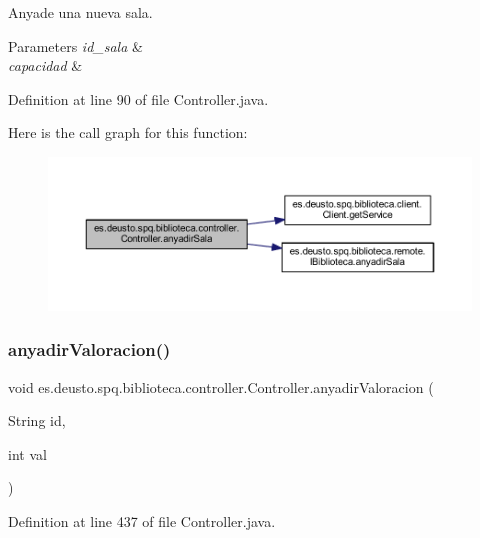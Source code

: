 Anyade una nueva sala. 
\begin{DoxyParams}{Parameters}
{\em id\+\_\+sala} & \\
\hline
{\em capacidad} & \\
\hline
\end{DoxyParams}


Definition at line 90 of file Controller.\+java.

Here is the call graph for this function\+:
\nopagebreak
\begin{figure}[H]
\begin{center}
\leavevmode
\includegraphics[width=350pt]{classes_1_1deusto_1_1spq_1_1biblioteca_1_1controller_1_1_controller_aa000adfc328c903b4915e2e20c94e22d_cgraph}
\end{center}
\end{figure}
\mbox{\label{classes_1_1deusto_1_1spq_1_1biblioteca_1_1controller_1_1_controller_acec274a871e11de7635bbfbe6fea2817}} 
\subsubsection{\texorpdfstring{anyadir\+Valoracion()}{anyadirValoracion()}}
{\footnotesize\ttfamily void es.\+deusto.\+spq.\+biblioteca.\+controller.\+Controller.\+anyadir\+Valoracion (\begin{DoxyParamCaption}\item[{String}]{id,  }\item[{int}]{val }\end{DoxyParamCaption})}



Definition at line 437 of file Controller.\+java.

